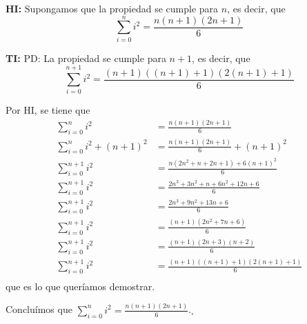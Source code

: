 \documentclass[12pt]{article}
\begin{document}
\textbf{HI:} Supongamos que la propiedad se cumple para $n$, es decir, que
\begin{equation*}
    \sum_{i=0}^n i^2 = \frac{n(n + 1)(2n + 1)}{6}
\end{equation*}

\textbf{TI:} PD: La propiedad se cumple para $n + 1$, es decir, que 
\begin{equation*}
    \sum_{i=0}^{n + 1} i^2 = \frac{(n + 1)((n + 1) + 1)(2(n + 1)+ 1)}{6}
\end{equation*}

Por HI, se tiene que
\begin{align*}
    \sum_{i=0}^n i^2 &= \frac{n(n + 1)(2n + 1)}{6} \\
    \sum_{i=0}^n i^2 + (n + 1)^2 &= \frac{n(n + 1)(2n + 1)}{6} + (n + 1)^2 \\
    \sum_{i=0}^{n + 1} i^2 &= \frac{n(2n^2 + n + 2n + 1) + 6(n + 1)^2}{6} \\
    \sum_{i=0}^{n + 1} i^2 &= \frac{2n^3 + 3n^2 + n + 6n^2 + 12n + 6}{6} \\
    \sum_{i=0}^{n + 1} i^2 &= \frac{2n^3 + 9n^2 + 13n + 6}{6} \\
    \sum_{i=0}^{n + 1} i^2 &= \frac{(n + 1)(2n^2 + 7n + 6)}{6} \\
    \sum_{i=0}^{n + 1} i^2 &= \frac{(n + 1)(2n + 3)(n + 2)}{6} \\
    \sum_{i=0}^{n + 1} i^2 &= \frac{(n + 1)((n + 1) + 1)(2(n + 1) + 1)}{6} \\
\end{align*}
que es lo que queríamos demostrar.

Concluímos que $\sum\limits_{i = 0}^n i^2 = \frac{n(n + 1)(2n + 1)}{6}$.$_\square$


\end{document}
